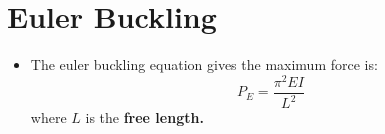 \section{Euler Buckling}
\begin{itemize}
    \item The euler buckling equation gives the maximum force is:
    \begin{equation}
        P_E = \frac{\pi^2  EI}{L^2}
        \label{eq:}
    \end{equation}
    where $L$ is the \textbf{free length.}
\end{itemize}